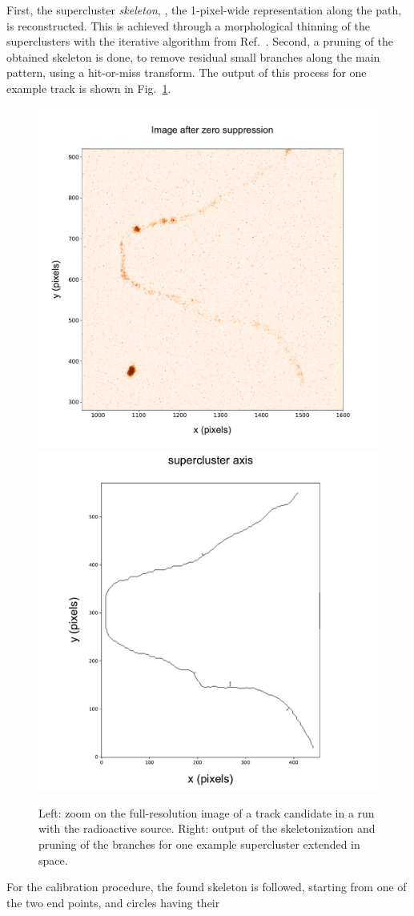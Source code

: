First, the supercluster \textit{skeleton}, \ie, the 1-pixel-wide
representation along the path, is reconstructed.  This is achieved
through a morphological thinning of the superclusters with the iterative
algorithm from Ref.~\cite{thin1,thin2}.  Second, a pruning of the
obtained skeleton is done, to remove residual small branches along the
main pattern, using a hit-or-miss transform. The output of this
process for one example track is shown in Fig.~\ref{fig:skeleton}.
%
\begin{figure}[ht]
  \begin{center}
     \includegraphics[width=0.49\linewidth]{figures/pic_run02317_ev8_oriIma_paper_zoom}
     \includegraphics[width=0.49\linewidth]{figures/skeleton_paper}

      \caption{Left: zoom on the full-resolution image of a track
        candidate in a run with the \ambe radioactive source. Right:
        output of the skeletonization and pruning of the branches for
        one example supercluster extended in
        space.  \label{fig:skeleton}}

    \end{center}
\end{figure}
%
For the calibration procedure, the found skeleton is followed,
starting from one of the two end points, and circles having their
